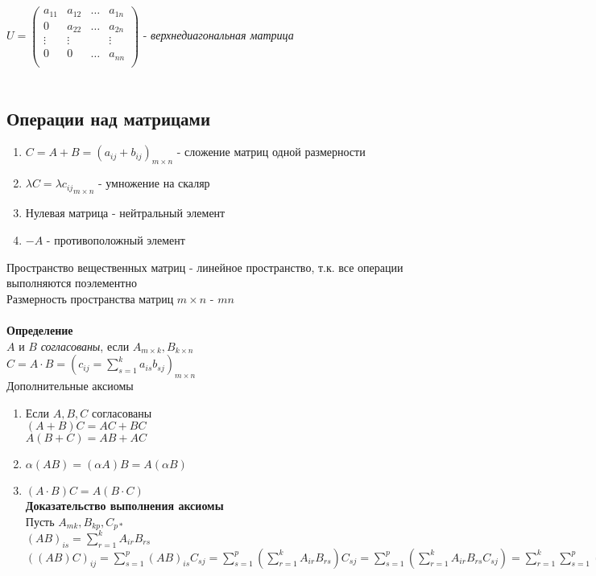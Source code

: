 \documentclass[12pt]{article}
\begin{document}
$U = \begin{pmatrix}
a_{11} & a_{12} & \ldots & a_{1n}\\
0 & a_{22} & \ldots & a_{2n}\\
\vdots & \vdots &  & \vdots\\
0 & 0 & \ldots & a_{nn}\\\end{pmatrix}$ - \textit{верхнедиагональная матрица}\\\\
\subsection{Операции над матрицами}
\begin{enumerate}
    \item $C = A+ B = (a_{ij} + b_{ij})_{m\times n}$ - сложение матриц одной размерности
    \item $\lambda C = {\lambda c_{ij}}_{m\times n}$ - умножение на скаляр
    \item Нулевая матрица - нейтральный элемент
    \item $-A$ - противоположный элемент
\end{enumerate}
Пространство вещественных матриц - линейное пространство, т.к. все операции выполняются поэлементно\\
Размерность пространства матриц $m\times n$ - $mn$\\\\
\textbf{Определение}\\
$A$ и $B$ \textit{согласованы}, если $A_{m\times k}, B_{k\times n}$\\
$C = A\cdot B = ( c_{ij} = \sum_{s=1}^k a_{is}b_{sj})_{m\times n}$\\
Дополнительные аксиомы
\begin{enumerate}
    \item[9.]  Если $A,B,C$ согласованы\\
    $(A+B)C = AC+BC$\\
    $A(B+C) = AB+AC$
    \item[10.] $\alpha(AB) = (\alpha A)B = A(\alpha B)$
    \item[11.] $(A\cdot B)C = A(B\cdot C)$\\
    \textbf{Доказательство выполнения аксиомы}\\
    Пусть $A_{mk}, B_{kp}, C_{p*}$\\
    $(AB)_{is} = \sum_{r=1}^k A_{ir}B_{rs}$\\
    $((AB)C)_{ij} = \sum_{s=1}^p (AB)_{is}C_{sj} = \sum_{s=1}^p (\sum_{r=1}^k A_{ir}B_{rs})C_{sj} = \sum_{s=1}^p (\sum_{r=1}^k A_{ir}B_{rs}C_{sj}) = \sum_{r=1}^k\sum_{s=1}^p ( A_{ir}B_{rs}C_{sj}) = \sum_{r=1}^k A_{ir} \sum_{s=1}^p ( B_{rs}C_{sj}) = \sum_{r=1}^k A_{ir} ( BC)_{rj} = (A(BC))_{ij}$
\end{enumerate}
\end{document}
